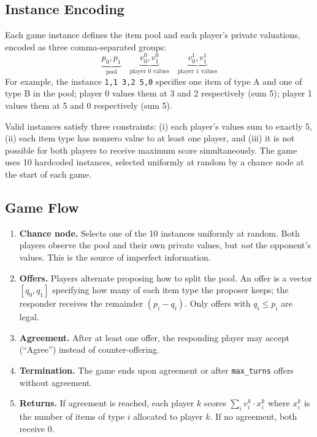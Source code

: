 \documentclass[11pt]{article}
\begin{document}
\subsection{Instance Encoding}

Each game instance defines the item pool and each player's private valuations, encoded as three comma-separated groups:
\[
\underbrace{p_0, p_1}_{\text{pool}} \quad \underbrace{v^0_0, v^0_1}_{\text{player 0 values}} \quad \underbrace{v^1_0, v^1_1}_{\text{player 1 values}}
\]
For example, the instance \texttt{1,1\ 3,2\ 5,0} specifies one item of type A and one of type B in the pool; player 0 values them at 3 and 2 respectively (sum 5); player 1 values them at 5 and 0 respectively (sum 5).

Valid instances satisfy three constraints: (i) each player's values sum to exactly 5, (ii) each item type has nonzero value to at least one player, and (iii) it is not possible for both players to receive maximum score simultaneously. The game uses 10 hardcoded instances, selected uniformly at random by a chance node at the start of each game.

\subsection{Game Flow}

\begin{enumerate}
    \item \textbf{Chance node.} Selects one of the 10 instances uniformly at random. Both players observe the pool and their own private values, but \emph{not} the opponent's values. This is the source of imperfect information.
    \item \textbf{Offers.} Players alternate proposing how to split the pool. An offer is a vector $[q_0, q_1]$ specifying how many of each item type the proposer keeps; the responder receives the remainder $(p_i - q_i)$. Only offers with $q_i \leq p_i$ are legal.
    \item \textbf{Agreement.} After at least one offer, the responding player may accept (``Agree'') instead of counter-offering.
    \item \textbf{Termination.} The game ends upon agreement or after \texttt{max\_turns} offers without agreement.
    \item \textbf{Returns.} If agreement is reached, each player $k$ scores $\sum_i v^k_i \cdot x^k_i$ where $x^k_i$ is the number of items of type $i$ allocated to player $k$. If no agreement, both receive 0.
\end{enumerate}
\end{document}

